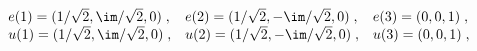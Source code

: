 \begin{equation}
\begin{array}{lll}
e(1) = (1/\sqrt{2} ,\im/\sqrt{2} ,0)\;, &
e(2) = (1/\sqrt{2} ,-\im/\sqrt{2} ,0)\;, & e(3) = (0,0,1)\;, \\
u(1) = (1/\sqrt{2} ,\im/\sqrt{2} ,0)\;, &
u(2) = (1/\sqrt{2} ,-\im/\sqrt{2} ,0)\;, & u(3) = (0,0,1)\;,
\end{array}
\label{G6}
\end{equation}

